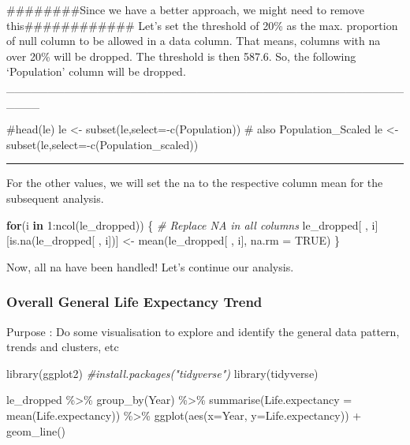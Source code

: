 \documentclass[
]{article}
\newenvironment{Shaded}{\begin{snugshade}}{\end{snugshade}}
\newcommand{\AttributeTok}[1]{\textcolor[rgb]{0.77,0.63,0.00}{#1}}
\newcommand{\CommentTok}[1]{\textcolor[rgb]{0.56,0.35,0.01}{\textit{#1}}}
\newcommand{\ConstantTok}[1]{\textcolor[rgb]{0.00,0.00,0.00}{#1}}
\newcommand{\ControlFlowTok}[1]{\textcolor[rgb]{0.13,0.29,0.53}{\textbf{#1}}}
\newcommand{\DecValTok}[1]{\textcolor[rgb]{0.00,0.00,0.81}{#1}}
\newcommand{\FunctionTok}[1]{\textcolor[rgb]{0.00,0.00,0.00}{#1}}
\newcommand{\NormalTok}[1]{#1}
\newcommand{\OtherTok}[1]{\textcolor[rgb]{0.56,0.35,0.01}{#1}}
\newcommand{\SpecialCharTok}[1]{\textcolor[rgb]{0.00,0.00,0.00}{#1}}
\begin{document}
\#\#\#\#\#\#\#\#Since we have a better approach, we might need to remove
this\#\#\#\#\#\#\#\#\#\#\#\# Let's set the threshold of 20\% as the max.
proportion of null column to be allowed in a data column. That means,
columns with na over 20\% will be dropped. The threshold is then 587.6.
So, the following `Population' column will be dropped.
\_\_\_\_\_\_\_\_\_\_\_\_\_\_\_\_\_\_\_\_\_\_\_\_\_\_\_\_\_\_\_\_\_\_\_\_\_\_\_\_\_\_\_\_\_\_\_\_\_\_\_\_

\#head(le) le \textless- subset(le,select=-c(Population)) \# also
Population\_Scaled le \textless-
subset(le,select=-c(Population\_scaled))

\begin{center}\rule{0.5\linewidth}{0.5pt}\end{center}

For the other values, we will set the na to the respective column mean
for the subsequent analysis.

\begin{Shaded}
\begin{Highlighting}[]
\ControlFlowTok{for}\NormalTok{(i }\ControlFlowTok{in} \DecValTok{1}\SpecialCharTok{:}\FunctionTok{ncol}\NormalTok{(le\_dropped)) \{                                   }\CommentTok{\# Replace NA in all columns}
\NormalTok{  le\_dropped[ , i][}\FunctionTok{is.na}\NormalTok{(le\_dropped[ , i])] }\OtherTok{\textless{}{-}} \FunctionTok{mean}\NormalTok{(le\_dropped[ , i], }\AttributeTok{na.rm =} \ConstantTok{TRUE}\NormalTok{)}
\NormalTok{\}}
\end{Highlighting}
\end{Shaded}

Now, all na have been handled! Let's continue our analysis.

\hypertarget{overall-general-life-expectancy-trend}{%
\subsubsection{Overall General Life Expectancy
Trend}\label{overall-general-life-expectancy-trend}}

Purpose : Do some visualisation to explore and identify the general data
pattern, trends and clusters, etc

\begin{Shaded}
\begin{Highlighting}[]
\FunctionTok{library}\NormalTok{(ggplot2)}
\CommentTok{\#install.packages("tidyverse")}
\FunctionTok{library}\NormalTok{(tidyverse)}

\NormalTok{le\_dropped }\SpecialCharTok{\%\textgreater{}\%}
  \FunctionTok{group\_by}\NormalTok{(Year) }\SpecialCharTok{\%\textgreater{}\%}
  \FunctionTok{summarise}\NormalTok{(}\AttributeTok{Life.expectancy =} \FunctionTok{mean}\NormalTok{(Life.expectancy)) }\SpecialCharTok{\%\textgreater{}\%}
  \FunctionTok{ggplot}\NormalTok{(}\FunctionTok{aes}\NormalTok{(}\AttributeTok{x=}\NormalTok{Year,}
             \AttributeTok{y=}\NormalTok{Life.expectancy)) }\SpecialCharTok{+}    
  \FunctionTok{geom\_line}\NormalTok{()}
\end{Highlighting}
\end{Shaded}
\end{document}
